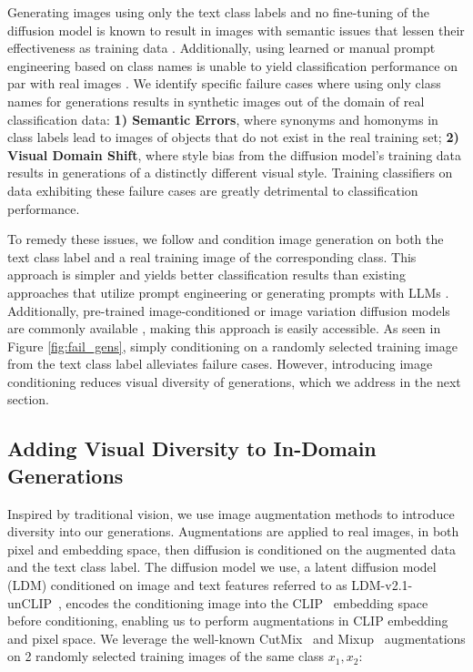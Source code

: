 Generating images using only the text class labels and no fine-tuning of the diffusion model is known to result in images with semantic issues that lessen their effectiveness as training data \citep{fake_it, feedbackguided, is_synthetic_data}. Additionally, using learned or manual prompt engineering based on class names is unable to yield classification performance on par with real images \citep{fake_it, is_synthetic_data}.
We identify specific failure cases where using only class names for generations results in synthetic images out of the domain of real classification data: \textbf{1) Semantic Errors}, where synonyms and homonyms in class labels lead to images of objects that do not exist in the real training set; \textbf{2) Visual Domain Shift}, where style bias from the diffusion model's training data results in generations of a distinctly different visual style. Training classifiers on data exhibiting these failure cases are greatly detrimental to classification performance.

To remedy these issues, we follow \cite{feedbackguided} and condition image generation on both the text class label and a real training image of the corresponding class. This approach is simpler and yields better classification results than existing approaches that utilize prompt engineering or generating prompts with LLMs \citep{fake_it, diversify}. 
Additionally, pre-trained image-conditioned or image variation diffusion models are commonly available \citep{stable_unclip, hugging_face}, making this approach is easily accessible.
As seen in Figure \ref{fig:fail_gens}, simply conditioning on a randomly selected training image from the text class label alleviates failure cases. However, introducing image conditioning reduces visual diversity of generations, which we address in the next section.

\vspace{-0.1cm}
\subsection{Adding Visual Diversity to In-Domain Generations} \label{sec:cond_methods}
\vspace{-0.2cm}

Inspired by traditional vision, we use image augmentation methods to introduce diversity into our generations. 
Augmentations are applied to real images, in both pixel and embedding space, then diffusion is conditioned on the augmented data and the text class label. 
The diffusion model we use, a latent diffusion model (LDM) conditioned on image and text features referred to as LDM-v2.1-unCLIP~\citep{stable_unclip}, encodes the conditioning image into the CLIP~\citep{CLIP} embedding space before conditioning, enabling us to perform augmentations in CLIP embedding and pixel space. 
We leverage the well-known CutMix~\citep{cutmix} and Mixup~\citep{mixup} augmentations on 2 randomly selected training images of the same class $x_1, x_2$:
\vspace{-0.5cm}

